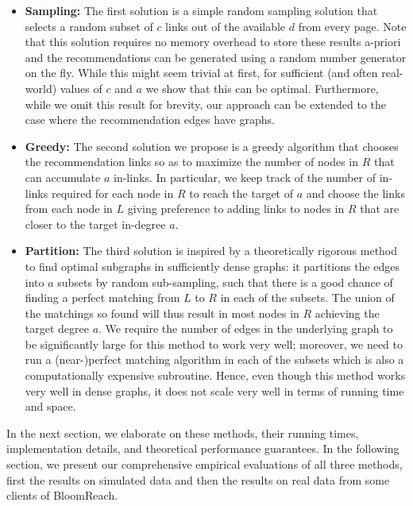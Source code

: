 \begin{itemize}

\item {\bf Sampling:} The first solution is a simple random sampling
  solution that selects a random subset of $c$ links out of the
  available $d$ from every page. Note that this solution requires no
  memory overhead to store these results a-priori and the
  recommendations can be generated using a random number generator on
  the fly. While this might seem trivial at first, for sufficient (and
  often real-world) values of $c$ and $a$ we show that this can be
  optimal. Furthermore, while we omit this result for brevity, our 
  approach can be extended to the case where the recommendation edges
  have graphs.

\item {\bf Greedy:} The second solution we propose is a greedy
  algorithm that chooses the recommendation links so as to maximize
  the number of nodes in $R$ that can accumulate $a$ in-links. In
  particular, we keep track of the number of in-links required for
  each node in $R$ to reach the target of $a$ and choose the links
  from each node in $L$ giving preference to adding links to nodes in
  $R$ that are closer to the target in-degree $a$.

\item {\bf Partition:} The third solution is inspired by a
  theoretically rigorous method to find optimal subgraphs in
  sufficiently dense graphs: it partitions the edges into $a$ subsets
  by random sub-sampling, such that there is a good chance of finding
  a perfect matching from $L$ to $R$ in each of the subsets. The union
  of the matchings so found will thus result in most nodes in $R$
  achieving the target degree $a$. We require the number of edges in
  the underlying graph to be significantly large for this method to
  work very well; moreover, we need to run a (near-)perfect matching
  algorithm in each of the subsets which is also a computationally
  expensive subroutine. Hence, even though this method works very well
  in dense graphs, it does not scale very well in terms of running
  time and space.
\end{itemize}

In the next section, we elaborate on these methods, their running
times, implementation details, and theoretical performance
guarantees. In the following section, we present our comprehensive
empirical evaluations of all three methods, first the results on
simulated data and then the results on real data from some clients of
BloomReach.

